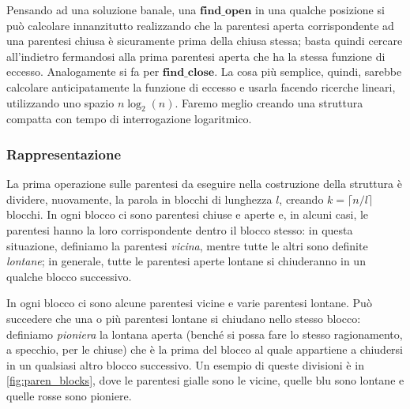 Pensando ad una soluzione banale, una $\mathbf{find\_open}$ in una qualche posizione si può
calcolare innanzitutto realizzando che la parentesi aperta corrispondente ad una
parentesi chiusa è sicuramente prima della chiusa stessa; basta quindi cercare all'indietro fermandosi
alla prima parentesi aperta che ha la stessa funzione di eccesso. Analogamente si fa per $\mathbf{find\_close}$.
La cosa più semplice, quindi, sarebbe calcolare anticipatamente la funzione di eccesso e usarla
facendo ricerche lineari, utilizzando uno spazio $n \log_2(n)$.
Faremo meglio creando una struttura compatta con tempo di interrogazione logaritmico.

\subsubsection{Rappresentazione}
La prima operazione sulle parentesi da eseguire nella costruzione della struttura è dividere, nuovamente,
la parola in blocchi di lunghezza $l$, creando $k = \lceil n/l \rceil$ blocchi. In ogni blocco
ci sono parentesi chiuse e aperte e, in alcuni casi, le parentesi hanno la loro corrispondente
dentro il blocco stesso: in questa situazione, definiamo la parentesi \textit{vicina}, mentre
tutte le altri sono definite \textit{lontane}; in generale, tutte le parentesi aperte lontane
si chiuderanno in un qualche blocco successivo.

In ogni blocco ci sono alcune parentesi vicine e varie parentesi lontane. Può succedere
che una o più parentesi lontane si chiudano nello stesso blocco: definiamo \textit{pioniera}
la lontana aperta (benché si possa fare lo stesso ragionamento, a specchio, per le chiuse)
che è la prima del blocco al quale appartiene a chiudersi in un qualsiasi altro blocco successivo.
Un esempio di queste divisioni è in \cref{fig:paren_blocks}, dove le parentesi gialle sono le vicine,
quelle blu sono lontane e quelle rosse sono pioniere.

